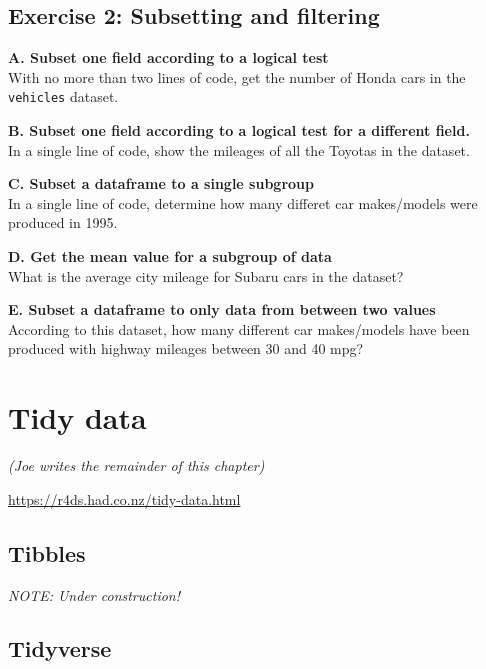 \documentclass[
]{book}
\begin{document}
\hypertarget{exercise-2-subsetting-and-filtering}{%
\subsection*{Exercise 2: Subsetting and filtering}\label{exercise-2-subsetting-and-filtering}}

\textbf{A. Subset one field according to a logical test}\\
With no more than two lines of code, get the number of Honda cars in the \texttt{vehicles} dataset.

\textbf{B. Subset one field according to a logical test for a different field.}\\
In a single line of code, show the mileages of all the Toyotas in the dataset.

\textbf{C. Subset a dataframe to a single subgroup}\\
In a single line of code, determine how many differet car makes/models were produced in 1995.

\textbf{D. Get the mean value for a subgroup of data}\\
What is the average city mileage for Subaru cars in the dataset?

\textbf{E. Subset a dataframe to only data from between two values}\\
According to this dataset, how many different car makes/models have been produced with highway mileages between 30 and 40 mpg?

\hypertarget{tidy-data}{%
\section*{Tidy data}\label{tidy-data}}

\emph{(Joe writes the remainder of this chapter)}

\url{https://r4ds.had.co.nz/tidy-data.html}

\hypertarget{tibbles}{%
\subsection*{Tibbles}\label{tibbles}}

\emph{NOTE: Under construction!}

\hypertarget{tidyverse}{%
\subsection*{Tidyverse}\label{tidyverse}}
\end{document}
